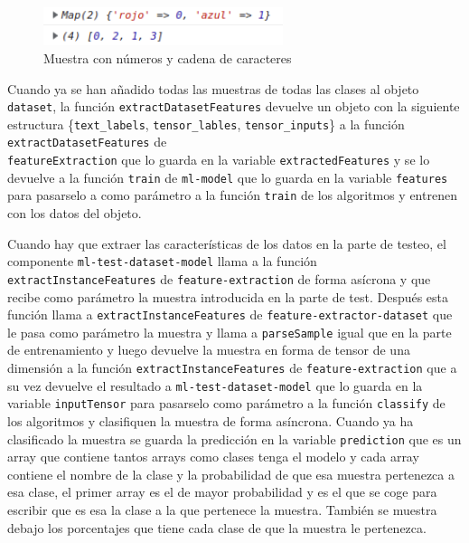 \documentclass[a4paper, 12pt]{book}
\begin{document}
\begin{figure}
	\centering
	\includegraphics[width=7cm, keepaspectratio]{img/ejemplo2.png}
	\caption{Muestra con números y cadena de caracteres} 	\label{fig:ejemplo2}
\end{figure}

Cuando ya se han añadido todas las muestras de todas las clases al objeto \texttt{dataset}, la función \texttt{extractDatasetFeatures} devuelve un objeto con la siguiente estructura \{\texttt{text\_labels}, \texttt{tensor\_lables}, \texttt{tensor\_inputs}\} a la función \texttt{extractDatasetFeatures} de \\ \texttt{featureExtraction} que lo guarda en la variable \texttt{extractedFeatures} y se lo devuelve a la función \texttt{train} de \texttt{ml-model} que lo guarda en la variable \texttt{features} para pasarselo a como parámetro a la función \texttt{train} de los algoritmos y entrenen con los datos del objeto.

Cuando hay que extraer las características de los datos en la parte de testeo, el componente \texttt{ml-test-dataset-model} llama a la función \texttt{extractInstanceFeatures} de \texttt{feature-extraction} de forma asícrona y que recibe como parámetro la muestra introducida en la parte de test. 
Después esta función llama a \texttt{extractInstanceFeatures} de \texttt{feature-extractor-dataset} que le pasa como parámetro la muestra y llama a \texttt{parseSample} igual que en la parte de entrenamiento y luego devuelve la muestra en forma de tensor de una dimensión a la función \texttt{extractInstanceFeatures} de \texttt{feature-extraction} que a su vez devuelve el resultado a \texttt{ml-test-dataset-model} que lo guarda en la variable \texttt{inputTensor} para pasarselo como parámetro a la función \texttt{classify} de los algoritmos y clasifiquen la muestra de forma asíncrona. 
Cuando ya ha clasificado la muestra se guarda la predicción en la variable \texttt{prediction} que es un array que contiene tantos arrays como clases tenga el modelo y cada array contiene el nombre de la clase y la probabilidad de que esa muestra pertenezca a esa clase, el primer array es el de mayor probabilidad y es el que se coge para escribir que es esa la clase a la que pertenece la muestra. 
También se muestra debajo los porcentajes que tiene cada clase de que la muestra le pertenezca.
\end{document}
